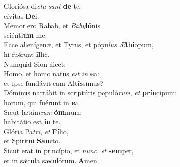 \evenverse Gloriósa di\textit{cta} \textit{sunt} \textbf{de} te,~\*\\
\evenverse cívitas \textbf{De}i.\\
\oddverse Memor ero Rahab, et \textit{Ba}\textit{by}\textbf{ló}nis~\*\\
\oddverse sciénti\textbf{um} me.\\
\evenverse Ecce alienígenæ, et Tyrus, et pópu\textit{lus} \textit{Æ}\textbf{thí}opum,~\*\\
\evenverse hi fuérunt \textbf{il}lic.\\
\oddverse Numquid Sion dicet:~+\\
\oddverse  Homo, et homo natus \textit{est} \textit{in} \textbf{e}a:~\*\\
\oddverse et ipse fundávit eam Al\textbf{tís}simus?\\
\evenverse Dóminus narrábit in scriptúris populó\textit{rum}, \textit{et} \textbf{prín}cipum:~\*\\
\evenverse horum, qui fuérunt in \textbf{e}a.\\
\oddverse Sicut lætán\textit{ti}\textit{um} \textbf{óm}nium:~\*\\
\oddverse habitátio est \textbf{in} te.\\
\evenverse Glória Pa\textit{tri}, \textit{et} \textbf{Fí}lio,~\*\\
\evenverse et Spirítui \textbf{San}cto.\\
\oddverse Sicut erat in princípio, et \textit{nunc}, \textit{et} \textbf{sem}per,~\*\\
\oddverse et in sǽcula sæculórum. \textbf{A}men.\\
